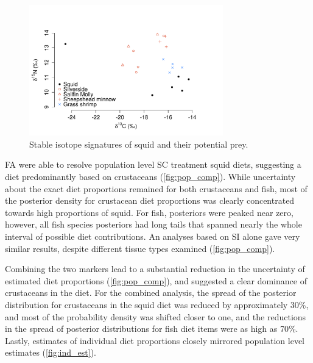 \documentclass{article}%
\begin{document}
\begin{spacing}{1.9}
\begin{flushleft}
\begin{figure}
  \begin{center}   
      \includegraphics[width=0.75\textwidth]{figures/SI_plot.pdf}
       \caption{Stable isotope signatures of squid and their potential prey.}
    \label{fig:squid_SI}
  \end{center}
\end{figure}

FA were able to resolve population level SC treatment squid diets,
suggesting a diet predominantly based on crustaceans
(\autoref{fig:pop_comp}). While uncertainty about the exact diet
proportions remained for both crustaceans and fish, most of the
posterior density for crustacean diet proportions was clearly
concentrated towards high
proportions of squid. For fish, posteriors were peaked near zero,
however, all fish species posteriors had long tails that spanned
nearly the whole interval of possible diet contributions. An analyses
based on SI alone gave very similar results, despite different tissue
types examined (\autoref{fig:pop_comp}). 

Combining the two markers lead to a substantial reduction in the
uncertainty of estimated diet proportions (\autoref{fig:pop_comp}),
and suggested a clear dominance of crustaceans in the diet. For the
combined analysis, the spread of the posterior distribution for crustaceans in the
squid diet was reduced by approximately 30\%, and most of the
probability density was shifted closer to one, and the reductions in
the spread of posterior distributions for fish diet items were as high
as 70\%. Lastly, estimates of individual diet proportions closely
mirrored population level estimates (\autoref{fig:ind_est}).


\end{flushleft}
\end{spacing}
\end{document}
